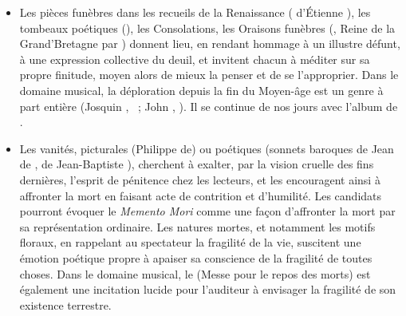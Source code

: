 {\begin{itemize}
\item Les pièces funèbres dans les recueils de la Renaissance (
d'Étienne ), les tombeaux poétiques (),
les Consolations, les Oraisons funèbres (,
Reine de la Grand'Bretagne par ) donnent lieu, en rendant hommage à un
illustre défunt, à une expression collective du deuil, et invitent chacun à méditer sur sa
propre finitude, moyen alors de mieux la penser et de se l'approprier. Dans le domaine
musical, la déploration depuis la fin du Moyen-âge est un genre à part entière
(Josquin , ~; John , ).
Il se continue de nos jours avec l'album  de .

\item Les vanités, picturales (Philippe de) ou poétiques (sonnets baroques
de Jean de , de Jean-Baptiste ), cherchent à exalter, par la vision
cruelle des fins dernières, l'esprit de pénitence chez les lecteurs, et les encouragent
ainsi à affronter la mort en faisant acte de contrition et d'humilité. Les candidats
pourront évoquer le \emph{Memento Mori} comme une façon d'affronter la mort par sa
représentation ordinaire. Les natures mortes, et notamment les motifs floraux, en
rappelant au spectateur la fragilité de la vie, suscitent une émotion poétique propre à
apaiser sa conscience de la fragilité de toutes choses. Dans le domaine musical, le
 (Messe pour le repos des morts) est également une incitation lucide pour
l'auditeur à envisager la fragilité de son existence terrestre.


\end{itemize}}
